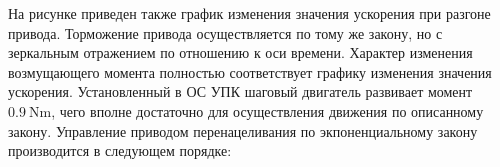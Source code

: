 На рисунке приведен также график изменения значения ускорения при разгоне привода. Торможение привода осуществляется по тому же закону, но с зеркальным отражением по отношению к оси времени. Характер изменения возмущающего момента полностью соответствует графику изменения значения ускорения. Установленный в ОС УПК шаговый двигатель развивает момент $\SI{0,9}{\newton\meter}$, чего вполне достаточно для осуществления движения по описанному закону.
Управление приводом перенацеливания по экпоненциальному закону производится в следующем порядке:



\FloatBarrier
